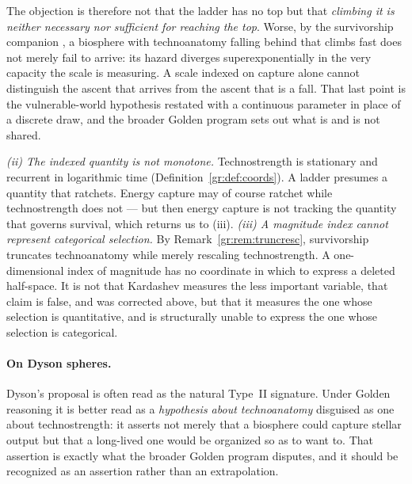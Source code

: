 The objection is therefore not that the ladder has no top but that
\emph{climbing it is neither necessary nor sufficient for reaching the
top}. Worse, by the survivorship companion \cite{GoldenSurvivorship}, a biosphere with
technoanatomy falling behind that climbs fast does not merely fail to arrive: its hazard
diverges superexponentially in the very capacity the scale is
measuring. A scale indexed on capture alone cannot distinguish the
ascent that arrives from the ascent that is a fall. That last point is
the vulnerable-world hypothesis \cite{Bostrom19} restated with a
continuous parameter in place of a discrete draw, and
the broader Golden program sets out what is and is not shared.

\emph{(ii) The indexed quantity is not monotone.} Technostrength is
stationary and recurrent in logarithmic time
(Definition~\ref{gr:def:coords}). A ladder presumes a quantity that
ratchets. Energy capture may of course ratchet while technostrength does
not --- but then energy capture is not tracking the quantity that
governs survival, which returns us to (iii). \emph{(iii) A magnitude index cannot represent categorical selection.}
By Remark~\ref{gr:rem:truncresc}, survivorship truncates technoanatomy
while merely rescaling technostrength. A one-dimensional index of
magnitude has no coordinate in which to express a deleted half-space. It
is not that Kardashev measures the less important variable, that
claim is false, and was corrected above, but that it measures the one
whose selection is quantitative, and is structurally unable to express
the one whose selection is categorical.

\paragraph{On Dyson spheres.}\label{gr:rem:dyson}
Dyson's proposal \cite{Dys60} is often read as the natural
Type~II signature. Under Golden reasoning it is better read as a
\emph{hypothesis about technoanatomy} disguised as one about
technostrength: it asserts not merely that a biosphere could capture
stellar output but that a long-lived one would be organized so as to
want to. That assertion is exactly what the broader Golden program
disputes, and it should be recognized as an assertion rather than an
extrapolation.


